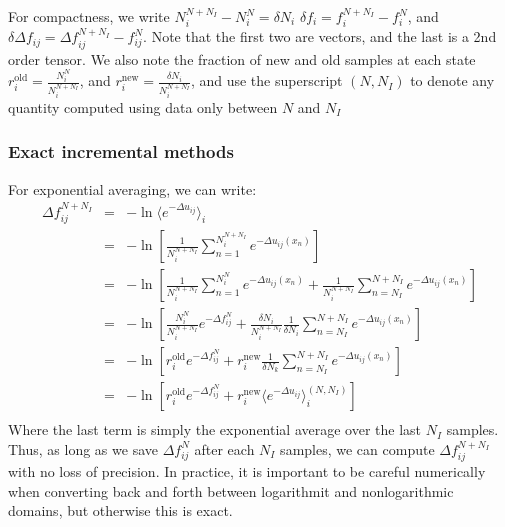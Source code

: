 \documentclass[superscriptaddress,showkeys, nofootinbib, pre, aps]{revtex4-1}
\newcommand{\ro}[1]{r_{#1}^{\mathrm{old}}}
\newcommand{\rn}[1]{r_{#1}^{\mathrm{new}}}
\begin{document}
For compactness, we write $N_i^{N+N_I} - N_i^{N} = \delta N_i$ $\delta f_i = f_i^{N+N_I} - f_i^{N}$, and $\delta \Delta f_{ij} =\Delta f_{ij}^{N+N_I} - f_{ij}^{N}$. Note that the first two are vectors, and the last is a 2nd order tensor. We also note the fraction of new and old samples at each state $\ro{i} = \frac{N_i^{N}}{N_i^{N+N_I}}$,
and $\rn{i} = \frac{\delta N_i}{N_i^{N+N_I}}$, and use the superscript
$(N,N_I)$ to denote any quantity computed using data only between $N$
and $N_I$

\subsubsection{Exact incremental methods}

For exponential averaging, we can write:
\begin{eqnarray*}
\Delta f_{ij}^{N+N_I} &=& -\ln \langle e^{-\Delta u_{ij}}\rangle_i \\
              &=& -\ln \left[\frac{1}{N_i^{N+N_I}}\sum_{n=1}^{N_i^{N+N_I}} e^{-\Delta u_{ij}(x_n)}\right]  \\
              &=& -\ln \left[\frac{1}{N_i^{N+N_I}}\sum_{n=1}^{N_i^{N}} e^{-\Delta u_{ij}(x_n)} + \frac{1}{N_i^{N+N_I}}\sum_{n=N_I}^{N+N_I} e^{-\Delta u_{ij}(x_n)}\right]   \\
              &=& -\ln \left[\frac{N_i^{N}}{N_i^{N+N_I}}e^{-\Delta f_{ij}^N} + \frac{\delta N_i}{N_i^{N+N_I}}\frac{1}{\delta N_i}\sum_{n=N_I}^{N+N_I} e^{-\Delta u_{ij}(x_n)}\right]   \\
              &=& -\ln \left[\ro{i} e^{-\Delta f_{ij}^N} + \rn{i}\frac{1}{\delta N_k}\sum_{n=N_I}^{N+N_I} e^{-\Delta u_{ij}(x_n)}\right]   \\
              &=& -\ln \left[\ro{i} e^{-\Delta f_{ij}^N} + \rn{i}\langle e^{-\Delta u_{ij}}\rangle_i^{(N,N_I)} \right]   \\
\end{eqnarray*}
Where the last term is simply the exponential average over the last $N_I$ samples.  Thus, as long as we save $\Delta f_{ij}^N$ after each $N_I$ samples, we can compute $\Delta f_{ij}^{N+N_I}$ with no loss of precision.  In practice, it is important to be careful numerically when converting back and forth between logarithmit and nonlogarithmic
domains, but otherwise this is exact.
\end{document}
